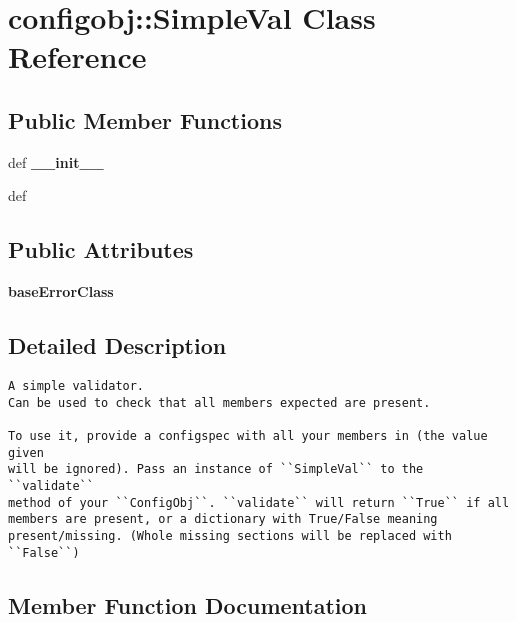 \section{configobj::Simple\-Val Class Reference}
\label{classconfigobj_1_1SimpleVal}
\subsection*{Public Member Functions}
\begin{CompactItemize}
\item 
def \textbf{\_\-\_\-init\_\-\_\-}\label{classconfigobj_1_1SimpleVal_93940f5ef0ac4faa7fe04f5ff2c5d856}

\item 
def {\bfcheck}
\end{CompactItemize}
\subsection*{Public Attributes}
\begin{CompactItemize}
\item 
\textbf{base\-Error\-Class}\label{classconfigobj_1_1SimpleVal_ee61dc1c187cae8b4b70ed38ea39b5c0}

\end{CompactItemize}


\subsection{Detailed Description}


\footnotesize\begin{verbatim}
A simple validator.
Can be used to check that all members expected are present.

To use it, provide a configspec with all your members in (the value given
will be ignored). Pass an instance of ``SimpleVal`` to the ``validate``
method of your ``ConfigObj``. ``validate`` will return ``True`` if all
members are present, or a dictionary with True/False meaning
present/missing. (Whole missing sections will be replaced with ``False``)
\end{verbatim}
\normalsize
 



\subsection{Member Function Documentation}
